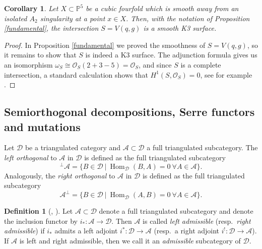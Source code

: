 \documentclass[a4paper, twoside, 11pt]{amsart}
\newtheorem{corollary}{Corollary}[theorem]
\theoremstyle{definition}
\newtheorem{definition}[theorem]{Definition}
\theoremstyle{remark}
\numberwithin{equation}{theorem}
\DeclareMathOperator{\Hom}{Hom}
\begin{document}
\begin{corollary}\label{S_is_K3}
	Let $X \subset \mathbb{P}^5$ be a cubic fourfold which is smooth away from an isolated $A_2$ singularity at a point $x \in X$. Then, with the notation of Proposition \ref{fundamental}, the intersection $S = V(q,g)$ is a smooth K3 surface. 
\end{corollary}
\begin{proof}
	In Proposition \ref{fundamental} we proved the smoothness of $S = V(q,g)$, so it remains to show that $S$ is indeed a K3 surface. 
	The adjunction formula gives us an isomorphism $\omega_S \cong \mathcal{O}_S(2+3-5) = \mathcal{O}_S$, and since $S$ is a complete intersection, a standard calculation shows that $H^1(S, \mathcal{O}_S) = 0$, see for example \cite[Ex.III.5.5c]{hartshorne}. 
\end{proof}
\subsection{Semiorthogonal decompositions, Serre functors and mutations}
Let $\mathcal{D}$ be a triangulated category and $\mathcal{A} \subset \mathcal{D}$ a full triangulated subcategory. The \textit{left orthogonal} to  $\mathcal{A}$ in $\mathcal{D}$ is defined as the full triangulated subcategory  
\begin{equation*}
	^\perp\mathcal{A} = \{B \in \mathcal{D} \ | \ \Hom_{\mathcal{D}}(B,A) = 0 \ \forall A \in \mathcal{A}\}.
\end{equation*}
Analogously, the \textit{right orthogonal} to $\mathcal{A}$ in $\mathcal{D}$ is defined as the full triangulated subcategory  
\begin{equation*}
	\mathcal{A}^\perp =\{B \in \mathcal{D} \ | \ \Hom_{\mathcal{D}}(A,B) = 0 \ \forall A \in \mathcal{A}\}.
\end{equation*}
\begin{definition}[{\cite{Bondal_ass_alg_coh}, \cite{BK_rep_funcots_serre_func}}]
	Let $\mathcal{A} \subset \mathcal{D}$ denote a full triangulated subcategory and denote the inclusion functor by $i_*\colon \mathcal{A} \to \mathcal{D}$. Then $\mathcal{A}$ is called \textit{left admissible} (resp.\ \textit{right admissible}) if $i_*$ admits a left adjoint $i^*\colon \mathcal{D} \to \mathcal{A}$ (resp.\ a right adjoint $i^!\colon \mathcal{D} \to \mathcal{A}$). If $\mathcal{A}$ is left and right admissible, then we call it an \textit{admissible} subcategory of $\mathcal{D}$.
\end{definition}
\end{document}
